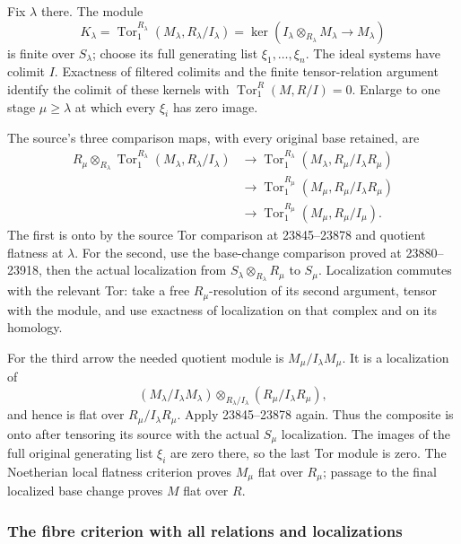 Fix \(\lambda\) there. The module \[
K_\lambda=\operatorname{Tor}_1^{R_\lambda}(M_\lambda,R_\lambda/I_\lambda)
 =\ker(I_\lambda\otimes_{R_\lambda}M_\lambda\to M_\lambda)
\] is finite over \(S_\lambda\); choose its full generating list \(\xi_1,\ldots,\xi_n\). The ideal systems have colimit \(I\). Exactness of filtered colimits and the finite tensor-relation argument identify the colimit of these kernels with \(\operatorname{Tor}_1^R(M,R/I)=0\). Enlarge to one stage \(\mu\geq\lambda\) at which every \(\xi_i\) has zero image.

The source's three comparison maps, with every original base retained, are \[
\begin{aligned}
R_\mu\otimes_{R_\lambda}\operatorname{Tor}_1^{R_\lambda}
 (M_\lambda,R_\lambda/I_\lambda)
&\longrightarrow \operatorname{Tor}_1^{R_\lambda}
 (M_\lambda,R_\mu/I_\lambda R_\mu)\\
&\longrightarrow \operatorname{Tor}_1^{R_\mu}
 (M_\mu,R_\mu/I_\lambda R_\mu)\\
&\longrightarrow \operatorname{Tor}_1^{R_\mu}
 (M_\mu,R_\mu/I_\mu).
\end{aligned}
\] The first is onto by the source Tor comparison at 23845--23878 and quotient flatness at \(\lambda\). For the second, use the base-change comparison proved at 23880--23918, then the actual localization from \(S_\lambda\otimes_{R_\lambda}R_\mu\) to \(S_\mu\). Localization commutes with the relevant Tor: take a free \(R_\mu\)-resolution of its second argument, tensor with the module, and use exactness of localization on that complex and on its homology.

For the third arrow the needed quotient module is \(M_\mu/I_\lambda M_\mu\). It is a localization of \[
(M_\lambda/I_\lambda M_\lambda)
 \otimes_{R_\lambda/I_\lambda}(R_\mu/I_\lambda R_\mu),
\] and hence is flat over \(R_\mu/I_\lambda R_\mu\). Apply 23845--23878 again. Thus the composite is onto after tensoring its source with the actual \(S_\mu\) localization. The images of the full original generating list \(\xi_i\) are zero there, so the last Tor module is zero. The Noetherian local flatness criterion proves \(M_\mu\) flat over \(R_\mu\); passage to the final localized base change proves \(M\) flat over \(R\).

\subsubsection{The fibre criterion with all relations and localizations}\label{algebra-proof-038-the-fibre-criterion-with-all-relations-and-localizations}

